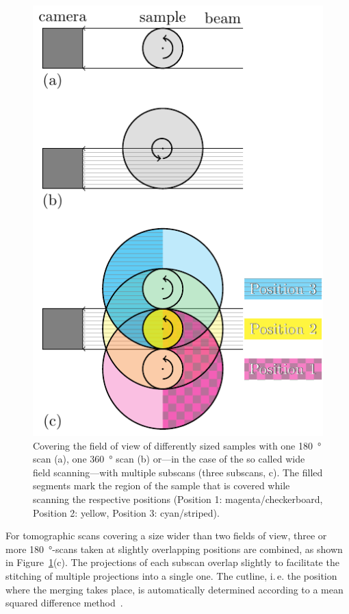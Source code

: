 \renewcommand{\imsize}{\linewidth}
\begin{figure}[p]
	\centering
	\includegraphics{img/Haberthuer2010/Fig01-FOV}
	\caption[Covering the field of view of differently sized samples]{Covering the field of view of differently sized samples with one \SI{180}{\degree} scan (a), one \SI{360}{\degree} scan (b) or---in the case of the so called wide field scanning---with multiple subscans (three subscans, c). The filled segments mark the region of the sample that is covered while scanning the respective positions (Position 1: magenta/checkerboard, Position 2: yellow, Position 3: cyan/striped).}
	\label{fig:scanning-possibilities}
\end{figure}

For tomographic scans covering a size wider than two fields of view, three or more \SI{180}{\degree}-scans taken at slightly overlapping positions are combined, as shown in Figure~\ref{fig:scanning-possibilities}(c). The projections of each subscan overlap slightly to facilitate the stitching of multiple projections into a single one. The cutline, i.\,e. the position where the merging takes place, is automatically determined according to a mean squared difference method~\cite{Hintermueller2010}.

